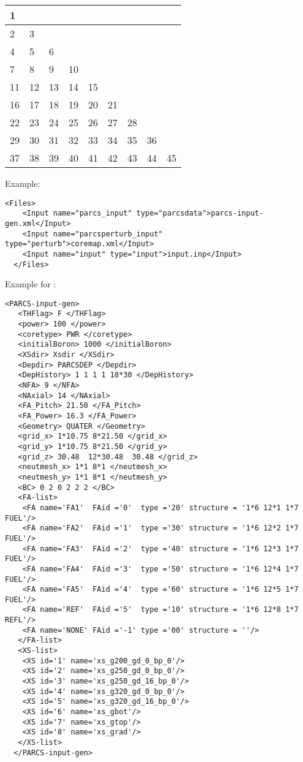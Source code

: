 \begin{center}
  \begin{tabular}{ |p{0.5cm}|p{0.5cm}|p{0.5cm}|p{0.5cm}|p{0.5cm}|p{0.5cm}|p{0.5cm}|p{0.5cm}|p{0.5cm}| } 
    \hline
    1& & & & & & & &  \\ 
    \hline
    2&3& & & & & & &  \\ 
    \hline
    4&5&6& & & & & &  \\ 
    \hline
    7&8&9&10& & & & &  \\ 
    \hline
    11&12&13&14&15& & & &  \\ 
    \hline
    16&17&18&19&20&21& & &  \\ 
    \hline
    22&23&24&25&26&27&28& & \\ 
    \hline
    29&30&31&32&33&34&35&36&  \\ 
    \hline
    37&38&39&40&41&42&43&44&45 \\ 
    \hline
  \end{tabular}
\end{center}
  
Example:
  \begin{lstlisting}[style=XML]
  <Files>
    <Input name="parcs_input" type="parcsdata">parcs-input-gen.xml</Input>
    <Input name="parcsperturb_input" type="perturb">coremap.xml</Input>
    <Input name="input" type="input">input.inp</Input>
  </Files>
  \end{lstlisting}
Example for :
  \begin{lstlisting}[style=XML]
  <PARCS-input-gen>
   <THFlag> F </THFlag>
   <power> 100 </power>
   <coretype> PWR </coretype>
   <initialBoron> 1000 </initialBoron>
   <XSdir> Xsdir </XSdir>
   <Depdir> PARCSDEP </Depdir>
   <DepHistory> 1 1 1 1 18*30 </DepHistory>
   <NFA> 9 </NFA>
   <NAxial> 14 </NAxial>
   <FA_Pitch> 21.50 </FA_Pitch>
   <FA_Power> 16.3 </FA_Power>
   <Geometry> QUATER </Geometry>
   <grid_x> 1*10.75 8*21.50 </grid_x>
   <grid_y> 1*10.75 8*21.50 </grid_y>
   <grid_z> 30.48  12*30.48  30.48 </grid_z>
   <neutmesh_x> 1*1 8*1 </neutmesh_x>
   <neutmesh_y> 1*1 8*1 </neutmesh_y>
   <BC> 0 2 0 2 2 2 </BC>
   <FA-list>
    <FA name='FA1'  FAid ='0'  type ='20' structure = '1*6 12*1 1*7 FUEL'/>
    <FA name='FA2'  FAid ='1'  type ='30' structure = '1*6 12*2 1*7 FUEL'/>
    <FA name='FA3'  FAid ='2'  type ='40' structure = '1*6 12*3 1*7 FUEL'/>
    <FA name='FA4'  FAid ='3'  type ='50' structure = '1*6 12*4 1*7 FUEL'/>
    <FA name='FA5'  FAid ='4'  type ='60' structure = '1*6 12*5 1*7 FUEL'/>
    <FA name='REF'  FAid ='5'  type ='10' structure = '1*6 12*8 1*7 REFL'/>
    <FA name='NONE' FAid ='-1' type ='00' structure = ''/>
   </FA-list>
   <XS-list>
    <XS id='1' name='xs_g200_gd_0_bp_0'/>
    <XS id='2' name='xs_g250_gd_0_bp_0'/>
    <XS id='3' name='xs_g250_gd_16_bp_0'/>
    <XS id='4' name='xs_g320_gd_0_bp_0'/>
    <XS id='5' name='xs_g320_gd_16_bp_0'/>
    <XS id='6' name='xs_gbot'/>
    <XS id='7' name='xs_gtop'/>
    <XS id='8' name='xs_grad'/>
   </XS-list>
  </PARCS-input-gen>

  \end{lstlisting}
